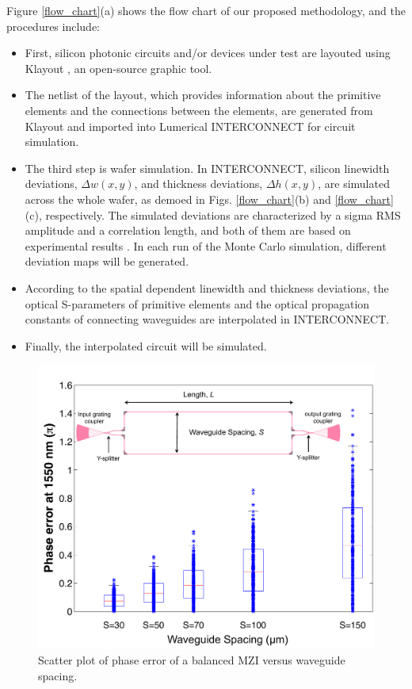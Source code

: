 \documentclass[journal]{spie}
\begin{document}
Figure \ref{flow_chart}(a) shows the flow chart of our proposed methodology, and the procedures include: 
\begin{itemize}
\item First, silicon photonic circuits and/or devices under test are layouted using Klayout \cite{www_klayout}, an open-source graphic tool. 
\item
The netlist of the layout, which provides information about the primitive elements and the connections between the elements, are generated from Klayout and imported into Lumerical INTERCONNECT for circuit simulation. 
\item
The third step is wafer simulation. In INTERCONNECT, silicon linewidth deviations, $\Delta w(x,y)$, and thickness deviations, $\Delta h(x,y)$, are simulated across the whole wafer, as demoed in Figs. \ref{flow_chart}(b) and \ref{flow_chart}(c), respectively. The simulated deviations are characterized by a sigma RMS amplitude and a correlation length, and both of them are based on experimental results \cite{lukas14:OFC,hochberg:wafer}. In each run of the Monte Carlo simulation, different deviation maps will be generated. 
\item
According to the spatial dependent linewidth and thickness deviations, the optical S-parameters of primitive elements and the optical propagation constants of connecting waveguides are interpolated in INTERCONNECT. 
\item
Finally, the interpolated circuit will be simulated. 
\end{itemize}

\begin{figure}[t]
    \centering
    \label{error}\includegraphics[width=0.8\linewidth]{error.pdf}
    \caption{Scatter plot of phase error of a balanced MZI versus waveguide spacing.} 
    \label{error}
\end{figure}
\end{document}
